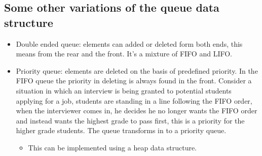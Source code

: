 \subsection{Some other variations of the queue data structure}
\begin{itemize}
    \item Double ended queue: elements can added or deleted form both ends, this means from the rear and the front. It's a mixture of FIFO and LIFO. 
    \item Priority queue: elements are deleted on the basis of predefined priority. In the FIFO queue the priority in deleting is always found in the front. Consider a situation in which an interview is being granted to potential students applying for a job, students are standing in a line following the FIFO order, when the interviewer comes in, he decides he no longer wants the FIFO order and instead wants the highest grade to pass first, this is a priority for the higher grade students. The queue transforms in to a priority queue. 
        \begin{itemize}
            \item This can be implemented using a heap data structure.
        \end{itemize}
\end{itemize}


